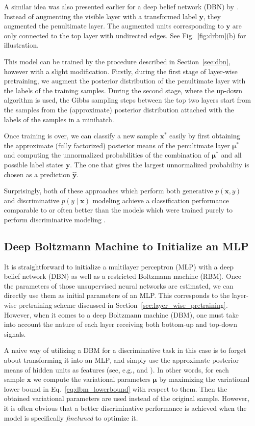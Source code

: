 \documentclass[dissertation,nocontribution]{aaltoseries}
\newcommand{\vect}[1]{\mathbf{#1}}
\newcommand{\vects}[1]{\boldsymbol{#1}}
\newcommand{\vx}[0]{\vect{x}}
\newcommand{\vy}[0]{\vect{y}}
\newcommand{\vmu}[0]{\vects{\mu}}
\begin{document}
A similar idea was also presented earlier for a deep belief
network (DBN) by \citet{Hinton2006nc}. Instead of augmenting
the visible layer with a transformed label $\vy$, they
augmented the penultimate layer. The augmented units
corresponding to $\vy$ are only connected to the top layer
with undirected edges. See Fig.~\ref{fig:drbm}(b) for
illustration.

This model can be trained by the procedure described in
Section~\ref{sec:dbn}, however with a slight modification.
Firstly, during the first stage of layer-wise pretraining,
we augment the posterior distribution of the penultimate
layer with the labels of the training samples. During the
second stage, where the up-down algorithm is used, the Gibbs
sampling steps between the top two layers start from the
samples from the (approximate) posterior distribution
attached with the labels of the samples in a minibatch. 

Once training is over, we can classify a new sample $\vx^*$
easily by first obtaining the approximate (fully factorized)
posterior means of the penultimate layer $\vmu^*$ and
computing the unnormalized probabilities of the combination
of $\vmu^*$ and all possible label states $\vy$. The one
that gives the largest unnormalized probability is
chosen as a prediction $\hat{\vy}$.

Surprisingly, both of these approaches which perform both
generative $p(\vx, y)$ and discriminative $p(y \mid \vx)$
modeling achieve a classification performance comparable
to or often better than the models which were trained
purely to perform discriminative modeling
\citep{Hinton2006nc,Larochelle2008}.

\subsection{Deep Boltzmann Machine to Initialize an MLP}
\label{sec:mlp_dbm}

It is straightforward to initialize a multilayer perceptron
(MLP) with a deep belief network (DBN) as well as a
restricted Boltzmann machine (RBM). Once the parameters of
those unsupervised neural networks are estimated, we can
directly use them as initial parameters of an MLP. This
corresponds to the layer-wise pretraining scheme discussed
in Section~\ref{sec:layer_wise_pretraining}.  However, when
it comes to a deep Boltzmann machine (DBM), one must take
into account the nature of each layer receiving both
bottom-up and top-down signals.

A naive way of utilizing a DBM for a discriminative task in
this case is to forget about transforming it into an MLP,
and simply use the approximate posterior means of hidden
units as features (see, e.g., \citet{Montavon2012ai} and
). In other words, for
each sample $\vx$ we compute the variational parameters
$\vmu$ by maximizing the variational lower bound in
Eq.~\eqref{eq:dbm_lowerbound} with respect to them. Then
the obtained variational parameters are used instead of the
original sample.  However, it is often obvious that a
better discriminative performance is achieved when the model
is specifically \textit{finetuned} to optimize it.
\end{document}
